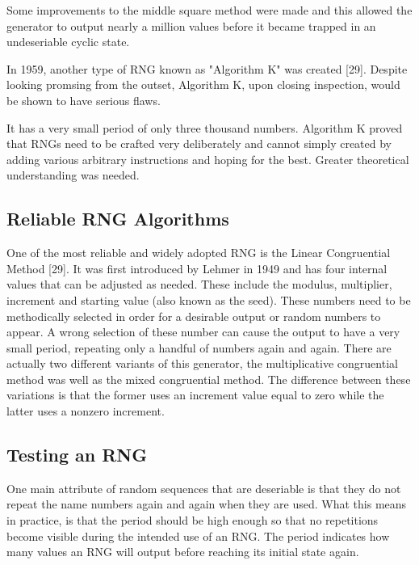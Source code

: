 \documentclass{article}
\begin{document}
    Some improvements to the middle square method were made and this allowed
    the generator to output nearly a million values before it became trapped
    in an undeseriable cyclic state.

    In 1959, another type of RNG known as "Algorithm K" was created [29].
    Despite looking promsing from the outset, Algorithm K, upon closing inspection,
    would be shown to have serious flaws.

    It has a very small period of only three thousand numbers.
    Algorithm K proved that RNGs need to be crafted very deliberately and cannot simply
    created by adding various arbitrary instructions and hoping for the best.
    Greater theoretical understanding was needed.
        
    \subsection{Reliable RNG Algorithms}

    One of the most reliable and widely adopted RNG is the Linear Congruential Method [29].
    It was first introduced by Lehmer in 1949 and has four internal values
    that can be adjusted as needed. These include the modulus, multiplier, increment
    and starting value (also known as the seed). These numbers need
    to be methodically selected in order for a desirable output or random numbers to appear.
    A wrong selection of these number can cause the output to have a very small period,
    repeating only a handful of numbers again and again.
    There are actually two different variants of this generator, the multiplicative congruential
    method was well as the mixed congruential method. The difference
    between these variations is that the former uses an increment value equal to zero while
    the latter uses a nonzero increment.

    \subsection{Testing an RNG}

    One main attribute of random sequences that are deseriable is that they do
    not repeat the name numbers again and again when they are used.
    What this means in practice, is that the period should be high enough so
    that no repetitions become visible during the intended use of an RNG.
    The period indicates how many values an RNG will output before reaching its
    initial state again.
\end{document}
